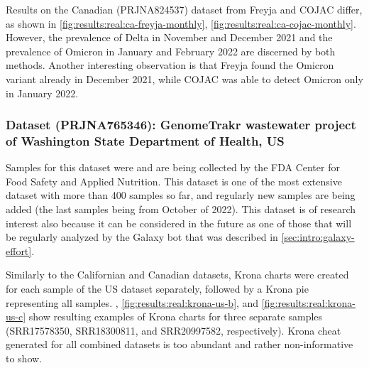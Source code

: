    Results on the Canadian (PRJNA824537) dataset from Freyja and COJAC differ, as shown in \cref{fig:results:real:ca-freyja-monthly}, \ref{fig:results:real:ca-cojac-monthly}. However, the prevalence of Delta in November and December 2021 and the prevalence of Omicron in January and February 2022 are discerned by both methods. Another interesting observation is that Freyja found the Omicron variant already in December 2021, while COJAC was able to detect Omicron only in January 2022.
    
    \subsubsection{Dataset (PRJNA765346): GenomeTrakr wastewater project of Washington State Department of Health, US} \label{sec:results:real:us}
    Samples for this dataset were and are being collected by the FDA Center for Food Safety and Applied Nutrition. This dataset is one of the most extensive dataset with more than 400 samples so far, and regularly new samples are being added (the last samples being from October of 2022). This dataset is of research interest also because it can be considered in the future as one of those that will be regularly analyzed by the Galaxy bot that was described in \cref{sec:intro:galaxy-effort}.

    Similarly to the Californian and Canadian datasets, Krona charts were created for each sample of the US dataset separately, followed by a Krona pie representing all samples. , \ref{fig:results:real:krona-us-b}, and \ref{fig:results:real:krona-us-c} show resulting examples of Krona charts for three separate samples (SRR17578350, SRR18300811, and SRR20997582, respectively). Krona cheat generated for all combined datasets is too abundant and rather non-informative to show.
    
